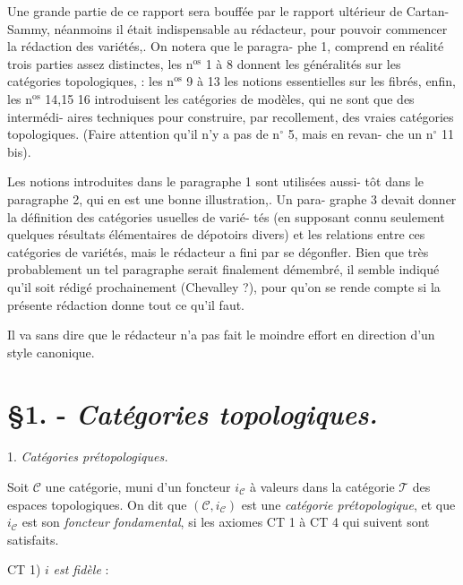 Une grande partie de ce rapport sera bouffée par le rapport ultérieur
de Cartan-Sammy, néanmoins il était indispensable au rédacteur, pour
pouvoir commencer la rédaction des variétés,. On notera que le paragra-
phe 1, comprend en réalité trois parties assez distinctes, les n$^{\text{os}}$ 1 à
8 donnent les généralités sur les catégories topologiques, : les n$^{\text{os}}$ 9
à 13 les notions essentielles sur les fibrés, enfin, les n$^{\text{os}}$ 14,15 16
introduisent les catégories de modèles, qui ne sont que des intermédi-
aires techniques pour construire, par recollement, des vraies catégories
topologiques. (Faire attention qu'il n'y a pas de n$^\circ$ 5, mais en revan-
che un n$^\circ$ 11 bis).

Les notions introduites dans le paragraphe 1 sont utilisées aussi-
tôt dans le paragraphe 2, qui en est une bonne illustration,. Un para-
graphe 3 devait donner la définition des catégories usuelles de varié-
tés (en supposant connu seulement quelques résultats élémentaires de
dépotoirs divers) et les relations entre ces catégories de variétés,
mais le rédacteur a fini par se dégonfler. Bien que très probablement
un tel paragraphe serait finalement démembré, il semble indiqué qu'il
soit rédigé prochainement (Chevalley ?), pour qu'on se rende compte
si la présente rédaction donne tout ce qu'il faut.

Il va sans dire que le rédacteur n'a pas fait le moindre effort en
direction d'un style canonique.

\newpage



\section*{\S 1. - \emph{Catégories topologiques.}}

1. \emph{Catégories prétopologiques.}

Soit $\mathcal{C}$ une catégorie, muni d'un foncteur $i_{\mathcal{C}}$ à valeurs dans la
catégorie $\mathcal{T}$ des espaces topologiques. On dit que $(\mathcal{C}, i_{\mathcal{C}})$ est une
\emph{catégorie prétopologique}, et que $i_{\mathcal{C}}$ est son \emph{foncteur fondamental}, si
les axiomes CT 1 à CT 4 qui suivent sont satisfaits.

CT 1) $i$ \emph{est fidèle} :

